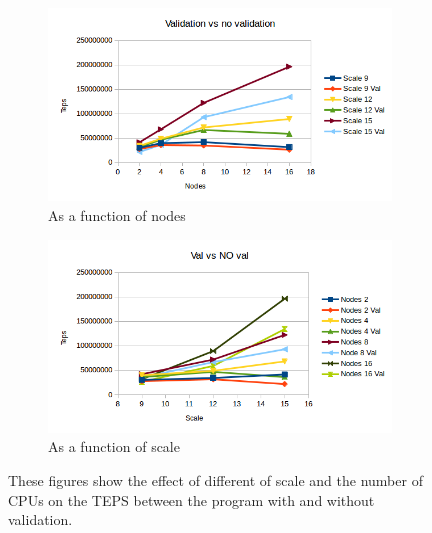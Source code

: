 \begin{figure}[!h]
\centering
\begin{subfigure}{.5\textwidth}
  \centering
  \includegraphics[width=\linewidth]{images/nodes_scale_vs_noscale.png}
  \caption{As a function of nodes}
  \label{fig:nodes_val_noval}
\end{subfigure}%
\begin{subfigure}{.5\textwidth}
  \centering
  \includegraphics[width=\linewidth]{images/scale_val_vs_noval.png}
  \caption{As a function of scale}
  \label{fig:scale_val_noval}
\end{subfigure}
\caption{These figures show the effect of different of scale and the number of CPUs on the TEPS between the program with and without validation.}
\label{fig:val_vs_noval}
\end{figure}

